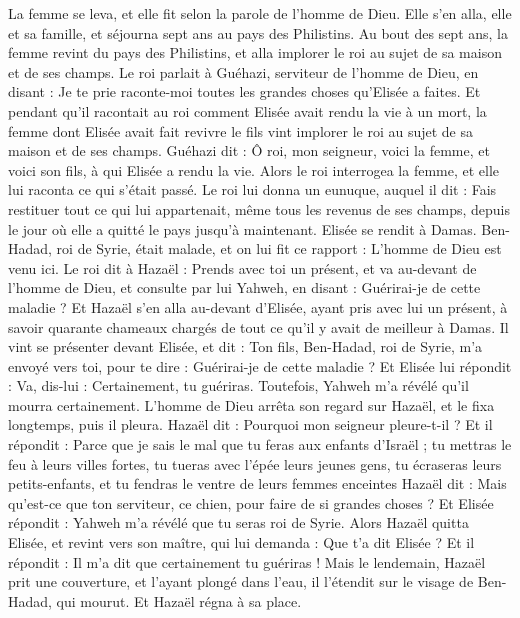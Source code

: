 \begin{multicols}{2}
La femme se leva, et elle fit selon la parole de l’homme de Dieu. Elle s’en alla, elle et sa famille, et séjourna sept ans au pays des Philistins.
Au bout des sept ans, la femme revint du pays des Philistins, et alla implorer le roi au sujet de sa maison et de ses champs.
Le roi parlait à Guéhazi, serviteur de l’homme de Dieu, en disant : Je te prie raconte-moi toutes les grandes choses qu’Elisée a faites.
Et pendant qu’il racontait au roi comment Elisée avait rendu la vie à un mort, la femme dont Elisée avait fait revivre le fils vint implorer le roi au sujet de sa maison et de ses champs. Guéhazi dit : Ô roi, mon seigneur, voici la femme, et voici son fils, à qui Elisée a rendu la vie.
Alors le roi interrogea la femme, et elle lui raconta ce qui s’était passé. Le roi lui donna un eunuque, auquel il dit : Fais restituer tout ce qui lui appartenait, même tous les revenus de ses champs, depuis le jour où elle a quitté le pays jusqu’à maintenant.
Elisée se rendit à Damas. Ben-Hadad, roi de Syrie, était malade, et on lui fit ce rapport : L’homme de Dieu est venu ici.
Le roi dit à Hazaël : Prends avec toi un présent, et va au-devant de l’homme de Dieu, et consulte par lui Yahweh, en disant : Guérirai-je de cette maladie ?
Et Hazaël s’en alla au-devant d’Elisée, ayant pris avec lui un présent, à savoir quarante chameaux chargés de tout ce qu’il y avait de meilleur à Damas. Il vint se présenter devant Elisée, et dit : Ton fils, Ben-Hadad, roi de Syrie, m’a envoyé vers toi, pour te dire : Guérirai-je de cette maladie ?
Et Elisée lui répondit : Va, dis-lui : Certainement, tu guériras. Toutefois, Yahweh m’a révélé qu’il mourra certainement.
L’homme de Dieu arrêta son regard sur Hazaël, et le fixa longtemps, puis il pleura.
Hazaël dit : Pourquoi mon seigneur pleure-t-il ? Et il répondit : Parce que je sais le mal que tu feras aux enfants d’Israël ; tu mettras le feu à leurs villes fortes, tu tueras avec l’épée leurs jeunes gens, tu écraseras leurs petits-enfants, et tu fendras le ventre de leurs femmes enceintes
Hazaël dit : Mais qu’est-ce que ton serviteur, ce chien, pour faire de si grandes choses ? Et Elisée répondit : Yahweh m’a révélé que tu seras roi de Syrie.
Alors Hazaël quitta Elisée, et revint vers son maître, qui lui demanda : Que t’a dit Elisée ? Et il répondit : Il m’a dit que certainement tu guériras !
Mais le lendemain, Hazaël prit une couverture, et l’ayant plongé dans l’eau, il l’étendit sur le visage de Ben-Hadad, qui mourut. Et Hazaël régna à sa place.

\end{multicols}
